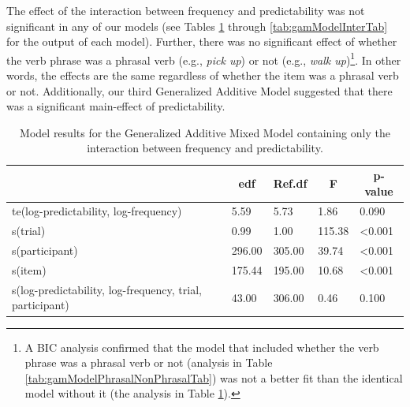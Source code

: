 \documentclass[
  man,floatsintext]{apa6}
\begin{document}
The effect of the interaction between frequency and predictability was not significant in any of our models (see Tables \ref{tab:gamModelTab} through \ref{tab:gamModelInterTab} for the output of each model). Further, there was no significant effect of whether the verb phrase was a phrasal verb (e.g., \emph{pick up}) or not (e.g., \emph{walk up})\footnote{A BIC analysis confirmed that the model that included whether the verb phrase was a phrasal verb or not (analysis in Table \ref{tab:gamModelPhrasalNonPhrasalTab}) was not a better fit than the identical model without it (the analysis in Table \ref{tab:gamModelTab}).}. In other words, the effects are the same regardless of whether the item was a phrasal verb or not. Additionally, our third Generalized Additive Model suggested that there was a significant main-effect of predictability.

\begin{table}[H]

\begin{center}
\begin{threeparttable}

\caption{\label{tab:gamModelTab}Model results for the Generalized Additive Mixed Model containing only the interaction between frequency and predictability.}

\begin{tabular}{lllll}
\toprule
 & \multicolumn{1}{c}{edf} & \multicolumn{1}{c}{Ref.df} & \multicolumn{1}{c}{F} & \multicolumn{1}{c}{p-value}\\
\midrule
te(log-predictability, log-frequency) & 5.59 & 5.73 & 1.86 & 0.090\\
s(trial) & 0.99 & 1.00 & 115.38 & <0.001\\
s(participant) & 296.00 & 305.00 & 39.74 & <0.001\\
s(item) & 175.44 & 195.00 & 10.68 & <0.001\\
s(log-predictability, log-frequency, trial, participant) & 43.00 & 306.00 & 0.46 & 0.100\\
\bottomrule
\end{tabular}

\end{threeparttable}
\end{center}

\end{table}
\end{document}
